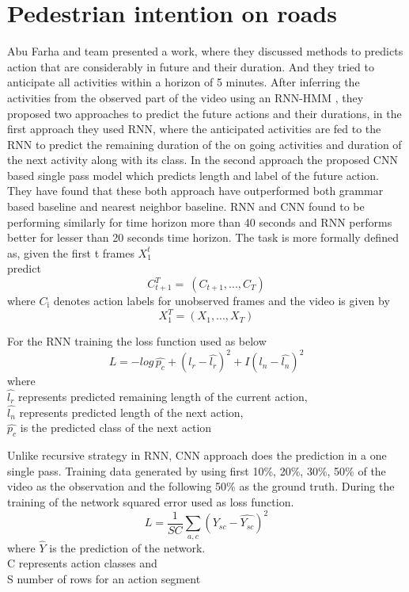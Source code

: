 \section{Pedestrian intention on roads}
\newpara Abu Farha and team presented \cite{abu2018will} a work, where they discussed methods to predicts action that are considerably in future and their duration. And they tried to anticipate all activities within a horizon of 5 minutes. After inferring the activities from the observed part of the video using an RNN-HMM \cite{richard2017weakly}, they proposed two approaches to predict the future actions and their durations, in the first approach they used RNN, where the anticipated activities are fed to the RNN to predict the remaining duration of the on going activities and duration of the next activity along with its class.
In the second approach the proposed CNN based single pass model which predicts length and label of the future action. They have found that these both approach have outperformed both grammar based baseline and nearest neighbor baseline. RNN and CNN found to be performing similarly for time horizon more than 40 seconds and RNN performs better for lesser than 20 seconds time horizon. The task is more formally defined as,
given the first t frames $X_{\text{1}}^t$ \\
predict \[ C_{t+1}^T  = \ (C_{t+1}, ..., C_{T}) \]
where $C_{\text{i}}$ denotes action labels for unobserved frames
and the video is given by
\[ X_{1}^T = (X_{1}, ..., X_{T}) \]

\newpara
For the RNN training the loss function used as below
\begin{equation}
    L = -log\, \hat{p_c} + (l_r - \hat{l_r})^2 +  I (l_n - \hat{l_n})^2 
\end{equation}
where \\
$\hat{l_r}$ represents predicted remaining length of the current action, \\
$\hat{l_n}$ represents predicted length of the next action, \\
$\hat{p_c}$ is the predicted class of the next action

\newpara Unlike recursive strategy in RNN, CNN approach does the prediction in a one single pass.
Training data generated by using first 10\%, 20\%, 30\%, 50\% of the video as the observation and the following 50\% as the ground truth. During the training of the network squared error used as loss function.
\begin{equation}
    L = \frac{1} {SC} \sum_{a,c} (Y_{sc} - \hat{Y_{sc}})^2 
\end{equation}
where $\hat{Y}$ is the prediction of the network. \\
C represents action classes and \\
S number of rows for an action segment

